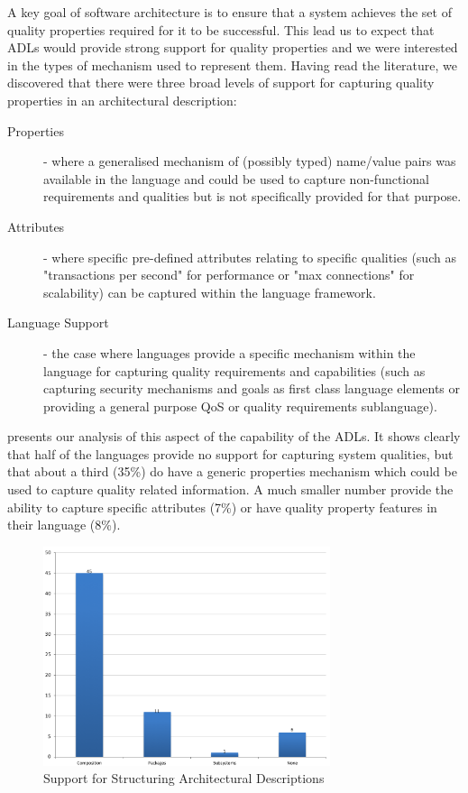 A key goal of software architecture is to ensure that a system achieves the set of quality properties required for it to be successful.  This lead us to expect that ADLs would provide strong support for quality properties and we were interested in the types of mechanism used to represent them.  Having read the literature, we discovered that there were three broad levels of support for capturing quality properties in an architectural description:
\begin{description}
	\item[Properties] - where a generalised mechanism of (possibly typed) name/value pairs was available in the language and could be used to capture non-functional requirements and qualities but is not specifically provided for that purpose.
	\item[Attributes] - where specific pre-defined attributes relating to specific qualities (such as "transactions per second" for performance or "max connections" for scalability) can be captured within the language framework.
	\item[Language Support] - the case where languages provide a specific mechanism within the language for capturing quality requirements and capabilities (such as capturing security mechanisms and goals as first class language elements or providing a general purpose QoS or quality requirements sublanguage).
\end{description}

 presents our analysis of this aspect of the capability of the ADLs.  It shows clearly that half of the languages provide no support for capturing system qualities, but that about a third (35\%) do have a generic properties mechanism which could be used to capture quality related information.  A much smaller number provide the ability to capture specific attributes (7\%) or have quality property features in their language (8\%).

\begin{figure}
\centering
\includegraphics[width=0.75\textwidth]{Figures/litreview-adl-structuring}
\caption{Support for Structuring Architectural Descriptions}
\label{figure:litreview-adl-structuring}
\end{figure}

